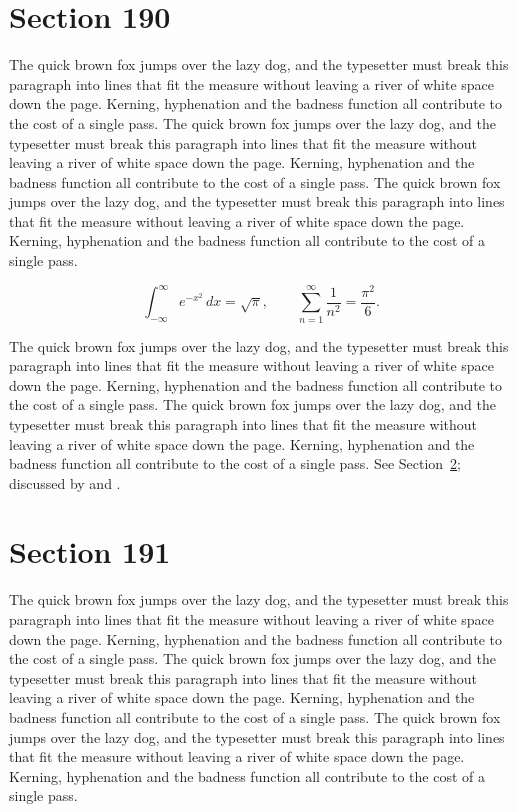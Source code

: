 \documentclass{article}
\begin{document}
\section{Section 190}
\label{sec:190}
The quick brown fox jumps over the lazy dog, and the typesetter must break this paragraph into lines that fit the measure without leaving a river of white space down the page. Kerning, hyphenation and the badness function all contribute to the cost of a single pass. The quick brown fox jumps over the lazy dog, and the typesetter must break this paragraph into lines that fit the measure without leaving a river of white space down the page. Kerning, hyphenation and the badness function all contribute to the cost of a single pass. The quick brown fox jumps over the lazy dog, and the typesetter must break this paragraph into lines that fit the measure without leaving a river of white space down the page. Kerning, hyphenation and the badness function all contribute to the cost of a single pass. 

\begin{equation}\label{eq:190}
\int_{-\infty}^{\infty} e^{-x^{2}}\,dx = \sqrt{\pi}, \qquad
\sum_{n=1}^{\infty} \frac{1}{n^{2}} = \frac{\pi^{2}}{6}.
\end{equation}

The quick brown fox jumps over the lazy dog, and the typesetter must break this paragraph into lines that fit the measure without leaving a river of white space down the page. Kerning, hyphenation and the badness function all contribute to the cost of a single pass. The quick brown fox jumps over the lazy dog, and the typesetter must break this paragraph into lines that fit the measure without leaving a river of white space down the page. Kerning, hyphenation and the badness function all contribute to the cost of a single pass. 
See Section~\ref{sec:191}; discussed by \textcite{k1} and \textcite{l3}.
\section{Section 191}
\label{sec:191}
The quick brown fox jumps over the lazy dog, and the typesetter must break this paragraph into lines that fit the measure without leaving a river of white space down the page. Kerning, hyphenation and the badness function all contribute to the cost of a single pass. The quick brown fox jumps over the lazy dog, and the typesetter must break this paragraph into lines that fit the measure without leaving a river of white space down the page. Kerning, hyphenation and the badness function all contribute to the cost of a single pass. The quick brown fox jumps over the lazy dog, and the typesetter must break this paragraph into lines that fit the measure without leaving a river of white space down the page. Kerning, hyphenation and the badness function all contribute to the cost of a single pass. 
\end{document}
